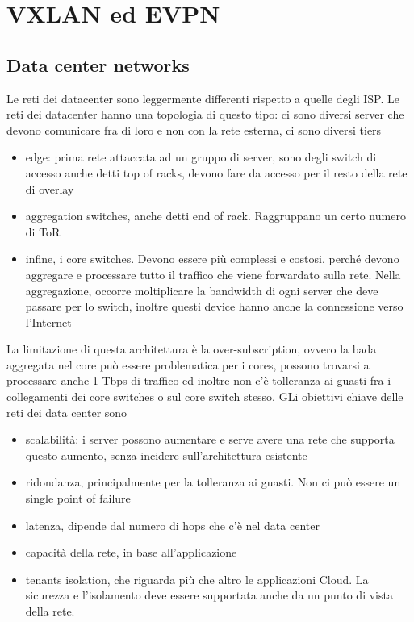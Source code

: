 \documentclass[12pt, oneside]{extbook} %
\begin{document}
\chapter{VXLAN ed EVPN}
\section{Data center networks}
Le reti dei datacenter sono leggermente differenti rispetto a quelle degli ISP. Le reti dei datacenter hanno una topologia di questo tipo:
ci sono diversi server che devono comunicare fra di loro e non con la rete esterna, ci sono diversi tiers
\begin{itemize}
\item edge: prima rete attaccata ad un gruppo di server, sono degli switch di accesso anche detti top of racks, devono fare da accesso per il resto della rete di overlay
\item aggregation switches, anche detti end of rack. Raggruppano un certo numero di ToR
\item infine, i core switches. Devono essere più complessi e costosi, perché devono aggregare e processare tutto il traffico che viene forwardato sulla rete. Nella aggregazione, occorre moltiplicare la bandwidth di ogni server che deve passare per lo switch, inoltre questi device hanno anche la connessione verso l'Internet
\end{itemize}
La limitazione di questa architettura è la over-subscription, ovvero la bada aggregata nel core può essere problematica per i cores, possono trovarsi a processare anche 1 Tbps di traffico ed inoltre non c'è tolleranza ai guasti fra i collegamenti dei core switches o sul core switch stesso. GLi obiettivi chiave delle reti dei data center sono
\begin{itemize}
\item scalabilità: i server possono aumentare e serve avere una rete che supporta questo aumento, senza incidere sull'architettura esistente
\item ridondanza, principalmente per la tolleranza ai guasti. Non ci può essere un single point of failure
\item latenza, dipende dal numero di hops che c'è nel data center
\item capacità della rete, in base all'applicazione 
\item tenants isolation, che riguarda più che altro le applicazioni Cloud. La sicurezza e l'isolamento deve essere supportata anche da un punto di vista della rete.
\end{itemize}
\end{document}
